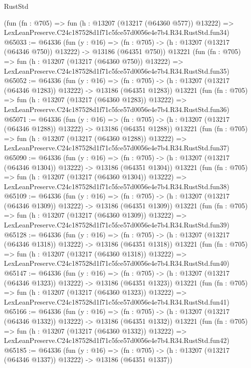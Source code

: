 \begin{lexlean}{RustStd}
\begin{coremodule}
    (fun (fn : @705) =>
    fun (h : @13207 (@13217 (@64360 @577)) @13222) =>
    LexLeanPreserve.C24c187528d1f71c5fce57d0056e4e7b4.R34.RustStd.fun34)
@65033 := @64336
    (fun (y : @16) =>
    (fn : @705) -> (h : @13207 (@13217 (@64346 @750)) @13222) -> @13186 (@64351 @750))
    @13221
    (fun (fn : @705) =>
    fun (h : @13207 (@13217 (@64360 @750)) @13222) =>
    LexLeanPreserve.C24c187528d1f71c5fce57d0056e4e7b4.R34.RustStd.fun35)
@65052 := @64336
    (fun (y : @16) =>
    (fn : @705) -> (h : @13207 (@13217 (@64346 @1283)) @13222) -> @13186 (@64351 @1283))
    @13221
    (fun (fn : @705) =>
    fun (h : @13207 (@13217 (@64360 @1283)) @13222) =>
    LexLeanPreserve.C24c187528d1f71c5fce57d0056e4e7b4.R34.RustStd.fun36)
@65071 := @64336
    (fun (y : @16) =>
    (fn : @705) -> (h : @13207 (@13217 (@64346 @1288)) @13222) -> @13186 (@64351 @1288))
    @13221
    (fun (fn : @705) =>
    fun (h : @13207 (@13217 (@64360 @1288)) @13222) =>
    LexLeanPreserve.C24c187528d1f71c5fce57d0056e4e7b4.R34.RustStd.fun37)
@65090 := @64336
    (fun (y : @16) =>
    (fn : @705) -> (h : @13207 (@13217 (@64346 @1304)) @13222) -> @13186 (@64351 @1304))
    @13221
    (fun (fn : @705) =>
    fun (h : @13207 (@13217 (@64360 @1304)) @13222) =>
    LexLeanPreserve.C24c187528d1f71c5fce57d0056e4e7b4.R34.RustStd.fun38)
@65109 := @64336
    (fun (y : @16) =>
    (fn : @705) -> (h : @13207 (@13217 (@64346 @1309)) @13222) -> @13186 (@64351 @1309))
    @13221
    (fun (fn : @705) =>
    fun (h : @13207 (@13217 (@64360 @1309)) @13222) =>
    LexLeanPreserve.C24c187528d1f71c5fce57d0056e4e7b4.R34.RustStd.fun39)
@65128 := @64336
    (fun (y : @16) =>
    (fn : @705) -> (h : @13207 (@13217 (@64346 @1318)) @13222) -> @13186 (@64351 @1318))
    @13221
    (fun (fn : @705) =>
    fun (h : @13207 (@13217 (@64360 @1318)) @13222) =>
    LexLeanPreserve.C24c187528d1f71c5fce57d0056e4e7b4.R34.RustStd.fun40)
@65147 := @64336
    (fun (y : @16) =>
    (fn : @705) -> (h : @13207 (@13217 (@64346 @1323)) @13222) -> @13186 (@64351 @1323))
    @13221
    (fun (fn : @705) =>
    fun (h : @13207 (@13217 (@64360 @1323)) @13222) =>
    LexLeanPreserve.C24c187528d1f71c5fce57d0056e4e7b4.R34.RustStd.fun41)
@65166 := @64336
    (fun (y : @16) =>
    (fn : @705) -> (h : @13207 (@13217 (@64346 @1332)) @13222) -> @13186 (@64351 @1332))
    @13221
    (fun (fn : @705) =>
    fun (h : @13207 (@13217 (@64360 @1332)) @13222) =>
    LexLeanPreserve.C24c187528d1f71c5fce57d0056e4e7b4.R34.RustStd.fun42)
@65185 := @64336
    (fun (y : @16) =>
    (fn : @705) -> (h : @13207 (@13217 (@64346 @1337)) @13222) -> @13186 (@64351 @1337))

\end{coremodule}
\end{lexlean}
